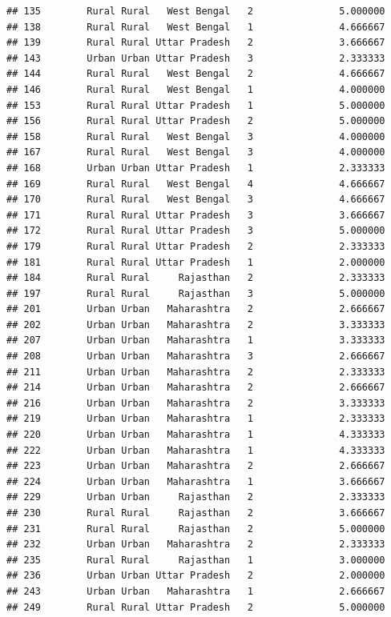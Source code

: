 \documentclass[
]{article}
\begin{document}
\begin{verbatim}
## 135        Rural Rural   West Bengal   2               5.000000
## 138        Rural Rural   West Bengal   1               4.666667
## 139        Rural Rural Uttar Pradesh   2               3.666667
## 143        Urban Urban Uttar Pradesh   3               2.333333
## 144        Rural Rural   West Bengal   2               4.666667
## 146        Rural Rural   West Bengal   1               4.000000
## 153        Rural Rural Uttar Pradesh   1               5.000000
## 156        Rural Rural Uttar Pradesh   2               5.000000
## 158        Rural Rural   West Bengal   3               4.000000
## 167        Rural Rural   West Bengal   3               4.000000
## 168        Urban Urban Uttar Pradesh   1               2.333333
## 169        Rural Rural   West Bengal   4               4.666667
## 170        Rural Rural   West Bengal   3               4.666667
## 171        Rural Rural Uttar Pradesh   3               3.666667
## 172        Rural Rural Uttar Pradesh   3               5.000000
## 179        Rural Rural Uttar Pradesh   2               2.333333
## 181        Rural Rural Uttar Pradesh   1               2.000000
## 184        Rural Rural     Rajasthan   2               2.333333
## 197        Rural Rural     Rajasthan   3               5.000000
## 201        Urban Urban   Maharashtra   2               2.666667
## 202        Urban Urban   Maharashtra   2               3.333333
## 207        Urban Urban   Maharashtra   1               3.333333
## 208        Urban Urban   Maharashtra   3               2.666667
## 211        Urban Urban   Maharashtra   2               2.333333
## 214        Urban Urban   Maharashtra   2               2.666667
## 216        Urban Urban   Maharashtra   2               3.333333
## 219        Urban Urban   Maharashtra   1               2.333333
## 220        Urban Urban   Maharashtra   1               4.333333
## 222        Urban Urban   Maharashtra   1               4.333333
## 223        Urban Urban   Maharashtra   2               2.666667
## 224        Urban Urban   Maharashtra   1               3.666667
## 229        Urban Urban     Rajasthan   2               2.333333
## 230        Rural Rural     Rajasthan   2               3.666667
## 231        Rural Rural     Rajasthan   2               5.000000
## 232        Urban Urban   Maharashtra   2               2.333333
## 235        Rural Rural     Rajasthan   1               3.000000
## 236        Urban Urban Uttar Pradesh   2               2.000000
## 243        Urban Urban   Maharashtra   1               2.666667
## 249        Rural Rural Uttar Pradesh   2               5.000000

\end{verbatim}
\end{document}
